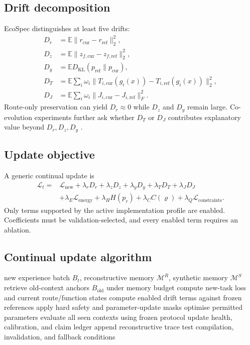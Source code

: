 \documentclass[10pt]{article}
\newcommand{\E}{\mathbb{E}}
\newcommand{\M}{\mathcal{M}}
\begin{document}
\subsection{Drift decomposition}

EcoSpec distinguishes at least five drifts:
\begin{align}
D_r &= \E\|r_{\mathrm{cur}}-r_{\mathrm{ref}}\|_2^2,\\
D_z &= \E\|z_{f,\mathrm{cur}}-z_{f,\mathrm{ref}}\|_2^2,\\
D_y &= \E D_{\mathrm{KL}}(p_{\mathrm{ref}}\|p_{\mathrm{cur}}),\\
D_T &= \E\sum_i \omega_i\|T_{i,\mathrm{cur}}(g_i(x))-T_{i,\mathrm{ref}}(g_i(x))\|_2^2,\\
D_J &= \E\sum_i \omega_i\|J_{i,\mathrm{cur}}-J_{i,\mathrm{ref}}\|_F^2.
\end{align}
Route-only preservation can yield $D_r\approx0$ while $D_z$ and $D_y$ remain large. Co-evolution experiments further ask whether $D_T$ or $D_J$ contributes explanatory value beyond $D_r,D_z,D_y$ \citep{mmalsv012}.

\subsection{Update objective}

A generic continual update is
\begin{align}
\mathcal L_t = {}& \mathcal L_{\mathrm{new}}
+\lambda_rD_r+\lambda_zD_z+\lambda_yD_y
+\lambda_TD_T+\lambda_JD_J\\
&+\lambda_E\mathcal L_{\mathrm{energy}}
+\lambda_H H(p_r)+\lambda_C C(\varrho)
+\lambda_Q\mathcal L_{\mathrm{constraints}}.
\label{eq:continualobjective}
\end{align}
Only terms supported by the active implementation profile are enabled. Coefficients must be validation-selected, and every enabled term requires an ablation.

\subsection{Continual update algorithm}

\begin{algorithm}[h]
\caption{Continual update with functional memory}
\label{alg:update}
\begin{algorithmic}[1]
\Require new experience batch $B_t$, reconstructive memory $\M^R$, synthetic memory $\M^S$
\State retrieve old-context anchors $B_{\mathrm{old}}$ under memory budget
\State compute new-task loss and current route/function states
\State compute enabled drift terms against frozen references
\State apply hard safety and parameter-update masks
\State optimise permitted parameters
\State evaluate all seen contexts using frozen protocol
\State update health, calibration, and claim ledger
\State append reconstructive trace
\State test compilation, invalidation, and fallback conditions
\end{algorithmic}
\end{algorithm}
\end{document}
